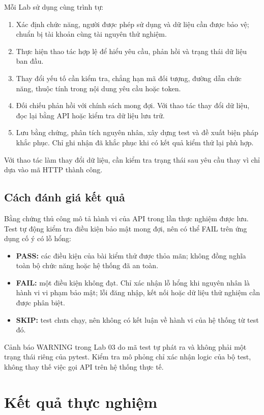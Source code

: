 \documentclass[oneside,a4paper,12pt]{extreport}
\begin{document}
Mỗi Lab sử dụng cùng trình tự:
\begin{enumerate}
    \item Xác định chức năng, người được phép sử dụng và dữ liệu cần
    được bảo vệ; chuẩn bị tài khoản cùng tài nguyên thử nghiệm.
    \item Thực hiện thao tác hợp lệ để hiểu yêu cầu, phản hồi và trạng
    thái dữ liệu ban đầu.
    \item Thay đổi yếu tố cần kiểm tra, chẳng hạn mã đối tượng, đường
    dẫn chức năng, thuộc tính trong nội dung yêu cầu hoặc token.
    \item Đối chiếu phản hồi với chính sách mong đợi. Với thao tác
    thay đổi dữ liệu, đọc lại bằng API hoặc kiểm tra dữ liệu lưu trữ.
    \item Lưu bằng chứng, phân tích nguyên nhân, xây dựng test và đề
    xuất biện pháp khắc phục. Chỉ ghi nhận đã khắc phục khi có kết quả
    kiểm thử lại phù hợp.
\end{enumerate}

Với thao tác làm thay đổi dữ liệu, cần kiểm tra trạng thái sau yêu
cầu thay vì chỉ dựa vào mã HTTP thành công.

\section{Cách đánh giá kết quả}

Bằng chứng thủ công mô tả hành vi của API trong lần thực nghiệm được
lưu. Test tự động kiểm tra điều kiện bảo mật mong đợi, nên có thể FAIL
trên ứng dụng cố ý có lỗ hổng:
\begin{itemize}
    \item \textbf{PASS:} các điều kiện của bài kiểm thử được thỏa mãn;
    không đồng nghĩa toàn bộ chức năng hoặc hệ thống đã an toàn.
    \item \textbf{FAIL:} một điều kiện không đạt. Chỉ xác nhận lỗ hổng
    khi nguyên nhân là hành vi vi phạm bảo mật; lỗi đăng nhập, kết nối
    hoặc dữ liệu thử nghiệm cần được phân biệt.
    \item \textbf{SKIP:} test chưa chạy, nên không có kết luận về hành
    vi của hệ thống từ test đó.
\end{itemize}

Cảnh báo WARNING trong Lab 03 do mã test tự phát ra và không phải một
trạng thái riêng của pytest. Kiểm tra mô phỏng chỉ xác nhận logic của
bộ test, không thay thế việc gọi API trên hệ thống thực tế.

\clearpage
\chapter{Kết quả thực nghiệm}
\label{chap:experiments}
\end{document}
